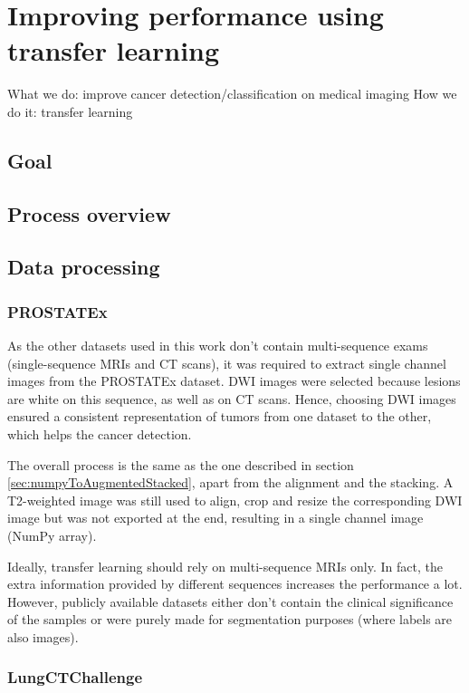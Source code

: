 
\chapter{Improving performance using transfer learning}
\label{ch:transfer_learning}

What we do: improve cancer detection/classification on medical imaging
How we do it: transfer learning

\section{Goal}

\section{Process overview}


\section{Data processing}
\subsection{PROSTATEx}
As the other datasets used in this work don't contain multi-sequence exams (single-sequence MRIs and CT scans), it was required to extract single channel images from the PROSTATEx dataset. DWI images were selected because lesions are white on this sequence, as well as on CT scans. Hence, choosing DWI images ensured a consistent representation of tumors from one dataset to the other, which helps the cancer detection.

The overall process is the same as the one described in section \ref{sec:numpyToAugmentedStacked}, apart from the alignment and the stacking. A T2-weighted image was still used to align, crop and resize the corresponding DWI image but was not exported at the end, resulting in a single channel image (NumPy array).

Ideally, transfer learning should rely on multi-sequence MRIs only. In fact, the extra information provided by different sequences increases the performance a lot. However, publicly available datasets either don't contain the clinical significance of the samples or were purely made for segmentation purposes (where labels are also images). 


\subsection{LungCTChallenge}
